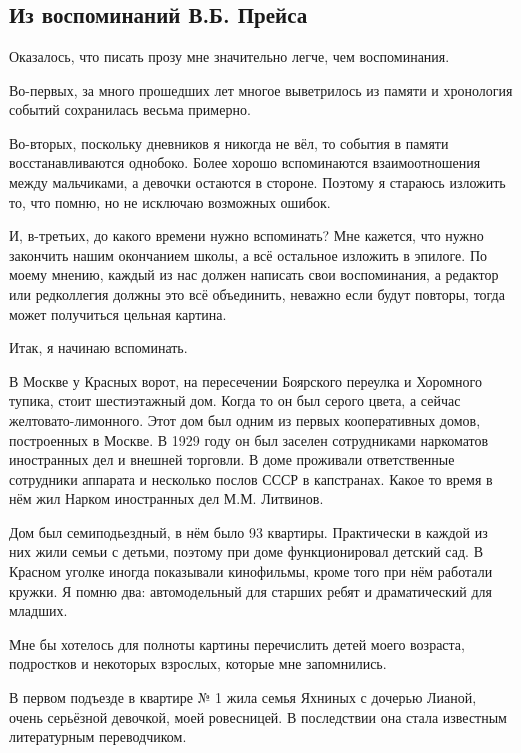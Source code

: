 \chapter{}
\section*{Из воспоминаний В.Б. Прейса}

Оказалось, что писать прозу мне значительно легче, чем воспоминания.

Во-первых, за много прошедших лет многое выветрилось из памяти и хронология событий сохранилась весьма примерно.

Во-вторых, поскольку дневников я никогда не вёл, то события в памяти восстанавливаются однобоко. Более хорошо вспоминаются взаимоотношения между мальчиками, а девочки остаются в стороне. Поэтому я стараюсь изложить то, что помню, но не исключаю возможных ошибок.

И, в-третьих, до какого времени нужно вспоминать? Мне кажется, что нужно закончить нашим окончанием школы, а всё остальное изложить в эпилоге. По моему мнению, каждый из нас должен написать свои воспоминания, а редактор или редколлегия должны это всё объединить, неважно если будут повторы, тогда может получиться цельная картина.

Итак, я начинаю вспоминать.

\indent

В Москве у Красных ворот, на пересечении Боярского переулка и Хоромного тупика, стоит шестиэтажный дом. Когда то он был серого цвета, а сейчас желтовато-лимонного. Этот дом был одним из первых кооперативных домов, построенных в Москве. В 1929 году он был заселен сотрудниками наркоматов иностранных дел и внешней торговли. В доме проживали ответственные сотрудники аппарата и несколько послов СССР в капстранах. Какое то время в нём жил Нарком иностранных дел М.М. Литвинов.

Дом был семиподьездный, в нём было 93 квартиры. Практически в каждой из них жили семьи с детьми, поэтому при доме функционировал детский сад. В Красном уголке иногда показывали кинофильмы, кроме того при нём работали кружки. Я помню два: автомодельный для старших ребят и драматический для младших.

Мне бы хотелось для полноты картины перечислить детей моего возраста, подростков и некоторых взрослых, которые мне запомнились.

В первом подъезде в квартире № 1 жила семья Яхниных с дочерью Лианой, очень серьёзной девочкой, моей ровесницей. В последствии она стала известным литературным переводчиком.

